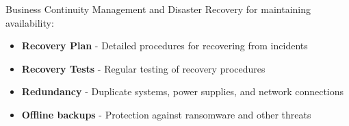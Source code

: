 \multend


\begin{theorem}{Business Continuity Management and Disaster Recovery}
for maintaining availability:
\begin{itemize}
    \item \textbf{Recovery Plan} - Detailed procedures for recovering from incidents
    \item \textbf{Recovery Tests} - Regular testing of recovery procedures
    \item \textbf{Redundancy} - Duplicate systems, power supplies, and network connections
    \item \textbf{Offline backups} - Protection against ransomware and other threats
\end{itemize}
\end{theorem}


\raggedcolumns




